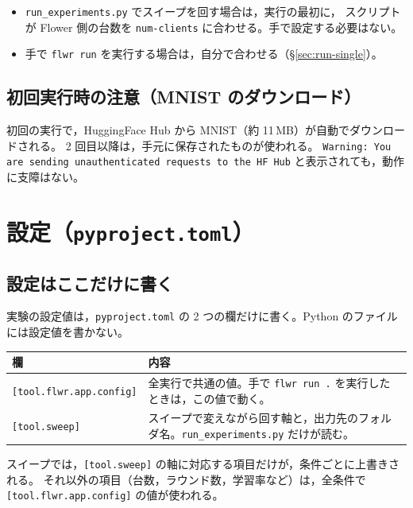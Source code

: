\documentclass[a4j, dvipdfmx]{jsarticle}  %
\begin{document}
\begin{itemize}
  \item \texttt{run\_experiments.py} でスイープを回す場合は，実行の最初に，
        スクリプトが Flower 側の台数を \texttt{num-clients} に合わせる。手で設定する必要はない。
  \item 手で \texttt{flwr run} を実行する場合は，自分で合わせる（\S\ref{sec:run-single}）。
\end{itemize}

\subsection{初回実行時の注意（MNIST のダウンロード）}

初回の実行で，HuggingFace Hub から MNIST（約 11\,MB）が自動でダウンロードされる。
2 回目以降は，手元に保存されたものが使われる。
\texttt{Warning: You are sending unauthenticated requests to the HF Hub} と表示されても，動作に支障はない。

\section{設定（\texttt{pyproject.toml}）}
\label{sec:config}

\subsection{設定はここだけに書く}

実験の設定値は，\texttt{pyproject.toml} の 2 つの欄だけに書く。Python のファイルには設定値を書かない。

\begin{table}[H]
\centering
\begin{tabular}{@{}P{4.3cm} P{11.0cm}@{}}
\toprule
欄 & 内容 \\
\midrule
\texttt{[tool.flwr.app.config]} & 全実行で共通の値。手で \texttt{flwr run .} を実行したときは，この値で動く。 \\
\texttt{[tool.sweep]} & スイープで変えながら回す軸と，出力先のフォルダ名。\texttt{run\_experiments.py} だけが読む。 \\
\bottomrule
\end{tabular}
\end{table}

スイープでは，\texttt{[tool.sweep]} の軸に対応する項目だけが，条件ごとに上書きされる。
それ以外の項目（台数，ラウンド数，学習率など）は，全条件で \texttt{[tool.flwr.app.config]} の値が使われる。
\end{document}
